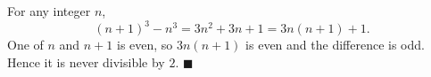 For any integer $n$,
\[
(n+1)^3-n^3=3n^2+3n+1=3n(n+1)+1 .
\]
One of $n$ and $n+1$ is even, so $3n(n+1)$ is even and the difference is odd. Hence it is never divisible by $2$. $\blacksquare$
